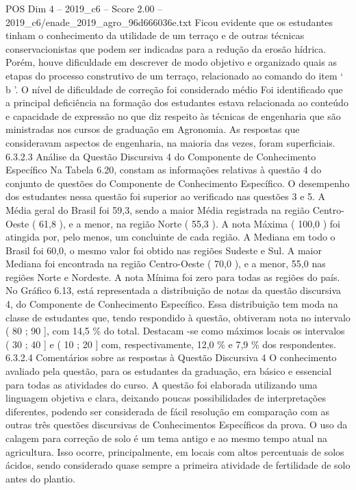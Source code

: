 \begin{textsample}{POS Dim 4 – 2019\_c6 – Score 2.00 – 2019\_c6/enade\_2019\_agro\_96d666036e.txt}
Ficou evidente que os estudantes tinham o conhecimento da utilidade de um terraço e de outras técnicas conservacionistas que podem ser indicadas para a redução da erosão hídrica.
Porém, houve dificuldade em descrever de modo objetivo e organizado quais as etapas do processo construtivo de um terraço, relacionado ao comando do item ‘ b ’.
O nível de dificuldade de correção foi considerado médio Foi identificado que a principal deficiência na formação dos estudantes estava relacionada ao conteúdo e capacidade de expressão no que diz respeito às técnicas de engenharia que são ministradas nos cursos de graduação em Agronomia.
As respostas que consideravam aspectos de engenharia, na maioria das vezes, foram superficiais. 6.3.2.3 Análise da Questão Discursiva 4 do Componente de Conhecimento Específico Na Tabela 6.20, constam as informações relativas à questão 4 do conjunto de questões do Componente de Conhecimento Específico.
O desempenho dos estudantes nessa questão foi superior ao verificado nas questões 3 e 5.
A Média geral do Brasil foi 59,3, sendo a maior Média registrada na região Centro-Oeste ( 61,8 ), e a menor, na região Norte ( 55,3 ).
A nota Máxima ( 100,0 ) foi atingida por, pelo menos, um concluinte de cada região.
A Mediana em todo o Brasil foi 60,0, o mesmo valor foi obtido nas regiões Sudeste e Sul.
A maior Mediana foi encontrada na região Centro-Oeste ( 70,0 ), e a menor, 55,0 nas regiões Norte e Nordeste.
A nota Mínima foi zero para todas as regiões do país.
No Gráfico 6.13, está representada a distribuição de notas da questão discursiva 4, do Componente de Conhecimento Específico.
Essa distribuição tem moda na classe de estudantes que, tendo respondido à questão, obtiveram nota no intervalo ( 80 ; 90 ], com 14,5 \% do total.
Destacam -se como máximos locais os intervalos ( 30 ; 40 ] e ( 10 ; 20 ] com, respectivamente, 12,0 \% e 7,9 \% dos respondentes. 6.3.2.4 Comentários sobre as respostas à Questão Discursiva 4 O conhecimento avaliado pela questão, para os estudantes da graduação, era básico e essencial para todas as atividades do curso.
A questão foi elaborada utilizando uma linguagem objetiva e clara, deixando poucas possibilidades de interpretações diferentes, podendo ser considerada de fácil resolução em comparação com as outras três questões discursivas de Conhecimentos Específicos da prova.
O uso da calagem para correção de solo é um tema antigo e ao mesmo tempo atual na agricultura.
Isso ocorre, principalmente, em locais com altos percentuais de solos ácidos, sendo considerado quase sempre a primeira atividade de fertilidade de solo antes do plantio.

\end{textsample}
